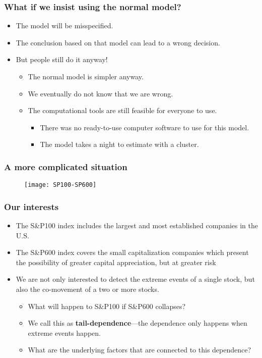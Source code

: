 \documentclass[11pt]{beamer}
\begin{document}
\begin{frame}
  \frametitle{What if we insist using the normal model?}
  \begin{itemize}
  \item The model will be misspecified.
  \item The conclusion based on that model can lead to a wrong decision.
  \item But people still do it anyway!
    \begin{itemize}
    \item The normal model is simpler anyway.
    \item We eventually do not know that we are wrong.
    \item The computational tools are still feasible for everyone to use.
      \begin{itemize}
      \item There was no ready-to-use computer software to use for this model.
      \item The model takes a night to estimate with a cluster.
      \end{itemize}
    \end{itemize}
  \end{itemize}

\end{frame}


\begin{frame}
  \frametitle{A more complicated situation}
  \begin{figure}
    \centering
    \texttt{[image: SP100-SP600]}
  \end{figure}
\end{frame}

\begin{frame}
  \frametitle{Our interests}

  \begin{itemize}
  \item The S\&P100 index includes the largest and most established companies
    in the U.S.

  \item The S\&P600 index covers the small capitalization companies
which present the possibility of greater capital appreciation, but at greater risk


  \item We are not only interested to detect the extreme events of a single
    stock, but also the co-movement of a two or more stocks.

    \begin{itemize}
    \item What will happen to S\&P100 if S\&P600 collapses?
    \item We call this as \textbf{tail-dependence}---the dependence only
      happens when extreme events happen.
    \item What are the underlying factors that are connected to this dependence?
    \end{itemize}
  \end{itemize}

\end{frame}
\end{document}
